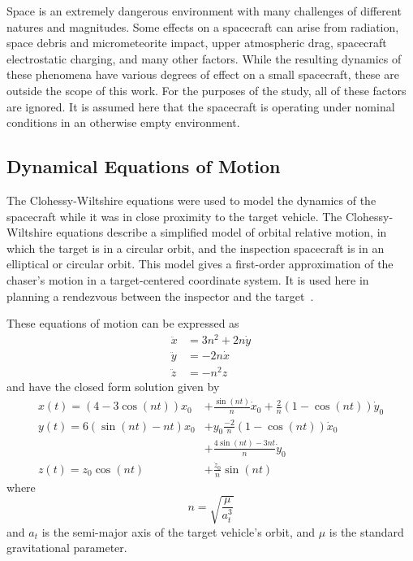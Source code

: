 \documentclass[journal, 10pt]{IEEEtran}
\begin{document}
Space is an extremely dangerous environment with many challenges of different natures and magnitudes. Some effects on a spacecraft can arise from radiation, space debris and micrometeorite impact, upper atmospheric drag, spacecraft electrostatic charging, and many other factors. While the resulting dynamics of these phenomena have various degrees of effect on a small spacecraft, these are outside the scope of this work. For the purposes of the study, all of these factors are ignored. It is assumed here that the spacecraft is operating under nominal conditions in an otherwise empty environment.

\subsection{Dynamical Equations of Motion} \label{cweqs}
The Clohessy-Wiltshire equations were used to model the dynamics of the spacecraft while it was in close proximity to the target vehicle. The Clohessy-Wiltshire equations describe a simplified model of orbital relative motion, in which the target is in a circular orbit, and the inspection spacecraft is in an elliptical or circular orbit. This model gives a first-order approximation of the chaser's motion in a target-centered coordinate system. It is used here in planning a rendezvous between the inspector and the target~\cite{cw_eqs}.

These equations of motion can be expressed as
\begin{equation}
\begin{split}
\ddot{x} &= 3n^2 + 2n\dot y \\
\ddot{y} &= -2n\dot x \\
\ddot{z} &= -n^2z
\end{split}
\end{equation}
and have the closed form solution given by
\begin{equation}
\begin{split}
x(t) = (4-3 \cos{(nt)})x_0 &+ \frac{\sin{(nt)}}{n}\dot x_0 + \frac{2}{n} (1 - \cos(nt))\dot y_0\\
y(t) = 6(\sin{(nt)}-nt)x_0 &+ y_0 \frac{-2}{n}(1 - \cos{(nt)})\dot x_0 \\
                         &+ \frac{4 \sin{(nt)} - 3nt}{n}\dot y_0 \\
z(t) = z_0 \cos{(nt)} &+ \frac{\dot z_0}{n} \sin{(nt)}
\end{split}
\end{equation}
where
\begin{equation}
n = \sqrt{\frac{\mu}{a^3_t}}
\end{equation}
and $a_t$ is the semi-major axis of the target vehicle's orbit, and $\mu$ is the standard gravitational parameter.
\end{document}
